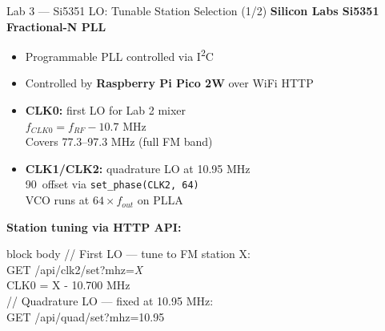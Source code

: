 \documentclass[aspectratio=169]{beamer}
\begin{document}
\begin{frame}{Lab 3 --- Si5351 LO: Tunable Station Selection (1/2)}
\textbf{Silicon Labs Si5351 Fractional-N PLL}
\begin{itemize}
  \item Programmable PLL controlled via I\textsuperscript{2}C
  \item Controlled by \textbf{Raspberry Pi Pico 2W} over WiFi HTTP
  \item \textbf{CLK0:} first LO for Lab 2 mixer\\
        $f_{CLK0} = f_{RF} - 10.7\text{ MHz}$\\
        Covers 77.3--97.3 MHz (full FM band)
  \item \textbf{CLK1/CLK2:} quadrature LO at 10.95 MHz\\
        90\textdegree\ offset via \texttt{set\_phase(CLK2, 64)}\\
        VCO runs at $64\times f_{out}$ on PLLA
\end{itemize}

\vspace{0.35cm}
\textbf{Station tuning via HTTP API:}
\begin{beamercolorbox}[rounded=true,shadow=false,wd=0.92\textwidth]{block body}
  \ttfamily\small
  // First LO --- tune to FM station X:\\
  \quad GET /api/clk2/set?mhz=\textit{X}\\
  \quad CLK0 = X - 10.700 MHz\\[6pt]
  // Quadrature LO --- fixed at 10.95 MHz:\\
  \quad GET /api/quad/set?mhz=10.95
\end{beamercolorbox}
\end{frame}
\end{document}
